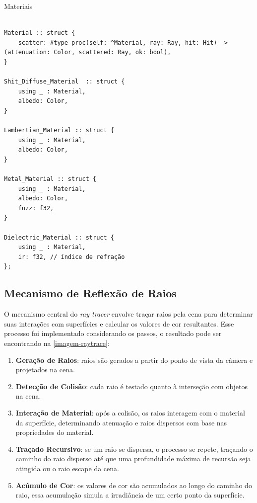 \documentclass[english, 
               brazil, 
               bsc] %
               {dcomp-abntex2}
\begin{document}
\begin{codigo}
\caption{Materiais}
\label{odin-materiais}
\begin{verbatim}

Material :: struct {
    scatter: #type proc(self: ^Material, ray: Ray, hit: Hit) -> (attenuation: Color, scattered: Ray, ok: bool),
}

Shit_Diffuse_Material  :: struct {
    using _ : Material,
    albedo: Color,
}

Lambertian_Material :: struct {
    using _ : Material,
    albedo: Color,
}

Metal_Material :: struct {
    using _ : Material,
    albedo: Color,
    fuzz: f32,
}

Dielectric_Material :: struct {
    using _ : Material,
    ir: f32, // índice de refração
};
\end{verbatim}
\end{codigo}


\subsection{Mecanismo de Reflexão de Raios}

O mecanismo central do \textit{ray tracer} envolve traçar raios pela cena para determinar suas interações com superfícies e calcular os valores de cor resultantes. Esse processo foi implementado considerando os passos, o resultado pode ser encontrando na \autoref{imagem-raytrace}:

\begin{enumerate}
\item \textbf{Geração de Raios}: raios são gerados a partir do ponto de vista da câmera e projetados na cena.
\item \textbf{Detecção de Colisão}: cada raio é testado quanto à interseção com objetos na cena.
\item \textbf{Interação de Material}: após a colisão, os raios interagem com o material da superfície, determinando atenuação e raios dispersos com base nas propriedades do material.
\item \textbf{Traçado Recursivo}: se um raio se dispersa, o processo se repete, traçando o caminho do raio disperso até que uma profundidade máxima de recursão seja atingida ou o raio escape da cena.
\item \textbf{Acúmulo de Cor}: os valores de cor são acumulados ao longo do caminho do raio, essa acumulação simula a irradiância de um certo ponto da superfície.

\end{enumerate}
\end{document}
